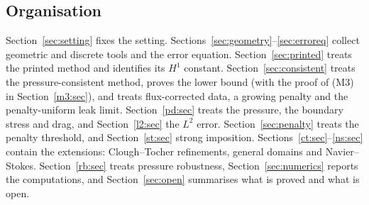 \subsection*{Organisation}
Section~\ref{sec:setting} fixes the setting. Sections~\ref{sec:geometry}--\ref{sec:erroreq} collect geometric and discrete tools and the error equation. Section~\ref{sec:printed} treats the printed method and identifies its $H^1$ constant. Section~\ref{sec:consistent} treats the pressure-consistent method, proves the lower bound (with the proof of (M3) in Section~\ref{m3:sec}), and treats flux-corrected data, a growing penalty and the penalty-uniform leak limit. Section~\ref{pd:sec} treats the pressure, the boundary stress and drag, and Section~\ref{l2:sec} the $L^2$ error. Section~\ref{sec:penalty} treats the penalty threshold, and Section~\ref{st:sec} strong imposition. Sections~\ref{ct:sec}--\ref{ns:sec} contain the extensions: Clough--Tocher refinements, general domains and Navier--Stokes. Section~\ref{rb:sec} treats pressure robustness, Section~\ref{sec:numerics} reports the computations, and Section~\ref{sec:open} summarises what is proved and what is open.
